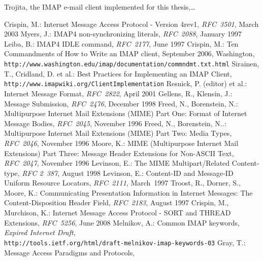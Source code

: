 \documentclass[12pt,notitlepage]{report}
\newcommand{\trojita}{Trojita\xspace}
\begin{document}
\trojita, the IMAP e-mail client implemented for this thesis,\ldots

\begin{thebibliography}{99}
    Crispin, M.: Internet Message Access Protocol - Version
        4rev1, {\em RFC~3501}, March 2003
    Myers, J.: IMAP4 non-synchronizing literals, {\em
        RFC~2088}, January 1997
    Leiba, B.: IMAP4 IDLE command, {\em RFC~2177}, June 1997
    Crispin, M.: Ten Commandments of How to
        Write an IMAP client, September 2006, Washington,\\
        {\tt http://www.washington.edu/imap/documentation/commndmt.txt.html}
    Sirainen, T., Cridland, D. et al.: Best
        Practices for Implementing an IMAP Client, {\tt
        http://www.imapwiki.org/ClientImplementation}
    Resnick, P. (editor) et al.: Internet Message Format, {\em
        RFC~2822}, April 2001
    Gellens, R., Klensin, J.: Message Submission, {\em
        RFC~2476}, December 1998
    Freed, N., Borenstein, N.: Multipurpose Internet
        Mail Extensions (MIME) Part One: Format of Internet Message Bodies, {\em
        RFC~2045}, November 1996
    Freed, N., Borenstein, N..: Multipurpose Internet
        Mail Extensions (MIME) Part Two: Media Types, {\em RFC~2046}, November
        1996
    Moore, K.: MIME (Multipurpose Internet Mail Extensions)
        Part Three: Message Header Extensions for Non-ASCII Text, {\em RFC~2047},
        November 1996
    Levinson, E.: The MIME Multipart/Related
        Content-type, {\em RFC 2~387}, August 1998
    Levinson, E.: Content-ID and Message-ID Uniform
        Resource Locators, {\em RFC~2111}, March~1997
    Troost, R., Dorner, S., Moore, K.:
        Communicating Presentation Information in Internet Messages: The
        Content-Disposition Header Field, {\em RFC~2183}, August 1997
    Crispin, M., Murchison, K.: Internet Message Access
        Protocol - SORT and THREAD Extensions, {\em RFC~5256}, June 2008
    Melnikov, A.: Common IMAP keywords, {\em
        Expired Internet Draft}, \\
        {\tt http://tools.ietf.org/html/draft-melnikov-imap-keywords-03}
    Gray, T.: Message Access Paradigms and Protocols,

\end{thebibliography}
\end{document}
